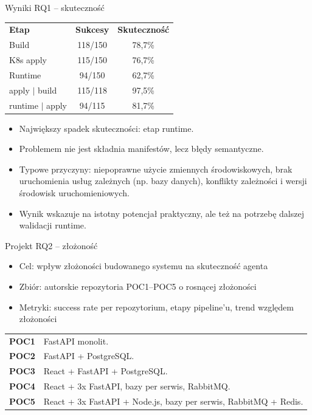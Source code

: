 \documentclass[aspectratio=169]{beamer}
\begin{document}
\begin{frame}{Wyniki RQ1 -- skuteczność}
    \small
    \begin{center}
        \begin{tabular}{lcc}
            \textbf{Etap} & \textbf{Sukcesy} & \textbf{Skuteczność} \\
            Build & 118/150 & 78,7\% \\
            K8s apply & 115/150 & 76,7\% \\
            Runtime & 94/150 & 62,7\% \\
            apply $|$ build & 115/118 & 97,5\% \\
            runtime $|$ apply & 94/115 & 81,7\% \\
        \end{tabular}
    \end{center}
    \vspace{0.6em}
    \begin{itemize}
        \item Największy spadek skuteczności: etap runtime.
        \item Problemem nie jest składnia manifestów, lecz błędy semantyczne.
        \item Typowe przyczyny: niepoprawne użycie zmiennych środowiskowych, brak uruchomienia usług zależnych (np. bazy danych),
        konflikty zależności i wersji środowisk uruchomieniowych.
        \item Wynik wskazuje na istotny potencjał praktyczny, ale też na potrzebę dalszej walidacji runtime.
    \end{itemize}
\end{frame}

\begin{frame}{Projekt RQ2 -- złożoność}
    \begin{itemize}
        \item Cel: wpływ złożoności budowanego systemu na skuteczność agenta
        \item Zbiór: autorskie repozytoria POC1--POC5 o rosnącej złożoności
        \item Metryki: success rate per repozytorium, etapy pipeline'u, trend względem złożoności
    \end{itemize}
    \small
    \vspace{0.4em}
    \begin{tabular}{lp{}}
        \textbf{POC1} & FastAPI monolit. \\
        \textbf{POC2} & FastAPI + PostgreSQL. \\
        \textbf{POC3} & React + FastAPI + PostgreSQL. \\
        \textbf{POC4} & React + 3x FastAPI, bazy per serwis, RabbitMQ. \\
        \textbf{POC5} & React + 3x FastAPI + Node.js, bazy per serwis, RabbitMQ + Redis. \\
    \end{tabular}
\end{frame}
\end{document}
